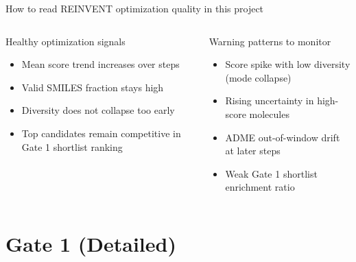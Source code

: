 \documentclass[aspectratio=169,10pt]{beamer}
\begin{document}
\begin{frame}{How to read REINVENT optimization quality in this project}
  \small
  \begin{columns}[T]
      \begin{block}{Healthy optimization signals}
        \begin{itemize}
          \item Mean score trend increases over steps
          \item Valid SMILES fraction stays high
          \item Diversity does not collapse too early
          \item Top candidates remain competitive in Gate 1 shortlist ranking
        \end{itemize}
      \end{block}
      \begin{block}{Warning patterns to monitor}
        \begin{itemize}
          \item Score spike with low diversity (mode collapse)
          \item Rising uncertainty in high-score molecules
          \item ADME out-of-window drift at later steps
          \item Weak Gate 1 shortlist enrichment ratio
        \end{itemize}
      \end{block}
  \end{columns}
\end{frame}

\section{Gate 1 (Detailed)}
\end{document}
